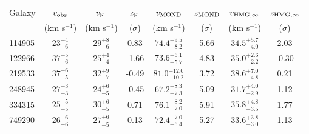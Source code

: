 \begin{tabular}{lccccccc}
\toprule
Galaxy & $v_{\rm obs}$ & $v_\text{\tiny N }$ & $z_\text{\tiny N }$ & $v_{\rm MOND}$ & $z_{\rm MOND}$ & $v_{\rm HMG,\infty}$ & $z_{\rm HMG,\infty}$ \\
 & (km s$^{-1}$) & (km s$^{-1}$) & ($\sigma$) & (km s$^{-1}$) & ($\sigma$) & (km s$^{-1}$) & ($\sigma$) \\
\midrule
114905 & $23^{+4}_{-6}$ & $29^{+8}_{-6}$ & 0.83 & $74.4^{+9.5}_{-8.2}$ & 5.66 & $34.5^{+5.7}_{-4.0}$ & 2.03 \\
122966 & $37^{+5}_{-6}$ & $25^{+4}_{-4}$ & -1.66 & $73.6^{+6.1}_{-5.7}$ & 4.83 & $35.0^{+2.6}_{-2.2}$ & -0.30 \\
219533 & $37^{+6}_{-5}$ & $32^{+9}_{-7}$ & -0.49 & $81.0^{+12.0}_{-10.2}$ & 3.72 & $38.6^{+7.0}_{-4.8}$ & 0.21 \\
248945 & $27^{+3}_{-3}$ & $24^{+6}_{-5}$ & -0.45 & $67.2^{+8.3}_{-7.3}$ & 5.09 & $31.7^{+4.0}_{-2.9}$ & 1.12 \\
334315 & $25^{+5}_{-5}$ & $30^{+6}_{-5}$ & 0.71 & $76.1^{+8.2}_{-7.0}$ & 5.91 & $35.8^{+4.8}_{-3.5}$ & 1.77 \\
749290 & $26^{+6}_{-6}$ & $27^{+6}_{-5}$ & 0.13 & $72.4^{+7.0}_{-6.4}$ & 5.27 & $33.6^{+3.8}_{-3.0}$ & 1.13 \\
\bottomrule
\end{tabular}
